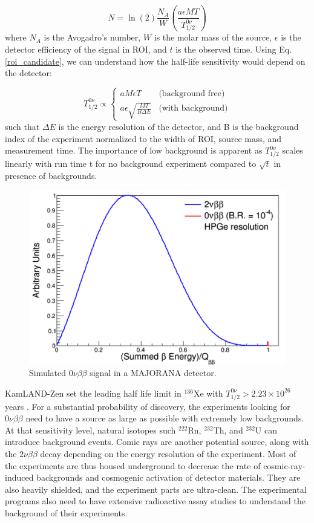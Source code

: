 \begin{equation}\label{roi_candidate}
N=\ln(2)\frac{N_A}{W}\left(\frac{a\epsilon MT}{T^{0\nu}_{1/2}}\right)
\end{equation}
where $N_A$ is the Avogadro's number, $W$ is the molar mass of the source, $\epsilon$ is the detector efficiency of the signal in ROI, and $t$ is the observed time. Using Eq. \ref{roi_candidate}, we can understand how the half-life sensitivity would depend on the detector:

\begin{equation}\label{det_sensitivity}
T^{0\nu}_{1/2} \propto
    \begin{cases}
    aM\epsilon T & \text{(background free)}\\
    a\epsilon\sqrt{\frac{MT}{B\Delta E}} & \text{(with background)}
    \end{cases}       
\end{equation}
such that $\Delta E$ is the energy resolution of the detector, and B is the background index of the experiment normalized to the width of ROI, source mass, and measurement time. The importance of low background is apparent as $T^{0\nu}_{1/2}$ scales linearly with run time t for no background experiment compared to $\sqrt{t}$ in presence of backgrounds.


\begin{figure}
\centering
\includegraphics[width=0.8\linewidth]{ch1/figs/DoubleBetaEnergy.png}
\caption{Simulated $0\nu\beta\beta$ signal in a MAJORANA detector. \cite{mjd_background}}
\label{mjd_background_fig}
\end{figure}

KamLAND-Zen set the leading half life limit in $^{136}$Xe with $T^{0\nu}_{1/2} > 2.23 \times 10^{26}$ years \cite{KamLAND-Zen:2024eml}.  For a substantial probability of discovery, the experiments looking for $0\nu\beta\beta$ need to have a source as large as possible with extremely low backgrounds. At that sensitivity level, natural isotopes such $^{222}$Rn, $^{232}$Th, and $^{232}$U can introduce background events. Comic rays are another potential source, along with the $2\nu\beta\beta$ decay depending on the energy resolution of the experiment. Most of the experiments are thus housed underground to decrease the rate of cosmic-ray-induced backgrounds and cosmogenic activation of detector materials. They are also heavily shielded, and the experiment parts are ultra-clean. The experimental programs also need to have extensive radioactive assay studies to understand the background of their experiments.

